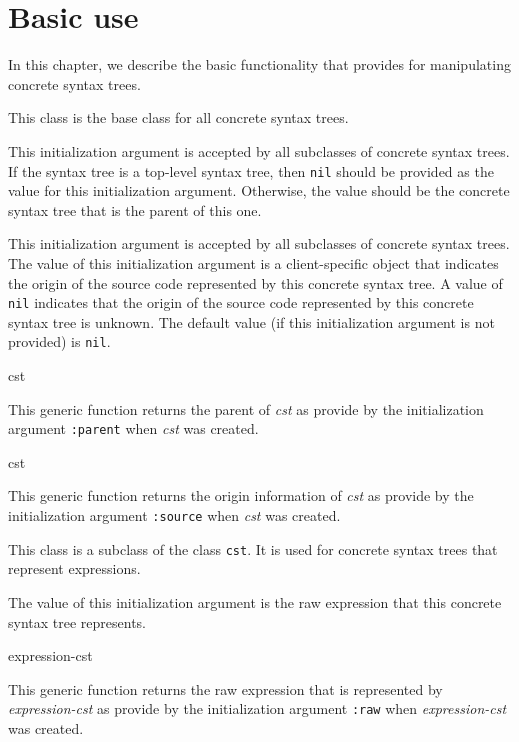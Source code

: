 \chapter{Basic use}

In this chapter, we describe the basic functionality that \sysname{}
provides for manipulating concrete syntax trees.


This class is the base class for all concrete syntax trees.


This initialization argument is accepted by all subclasses of concrete
syntax trees.  If the syntax tree is a top-level syntax tree, then
\texttt{nil} should be provided as the value for this initialization
argument.  Otherwise, the value should be the concrete syntax tree
that is the parent of this one.


This initialization argument is accepted by all subclasses of concrete
syntax trees.  The value of this initialization argument is a
client-specific object that indicates the origin of the source code
represented by this concrete syntax tree.  A value of \texttt{nil}
indicates that the origin of the source code represented by this concrete
syntax tree is unknown.  The default value (if this initialization
argument is not provided) is \texttt{nil}.

 {cst}

This generic function returns the parent of \textit{cst} as provide by
the initialization argument \texttt{:parent} when \textit{cst} was
created.

 {cst}

This generic function returns the origin information of \textit{cst}
as provide by the initialization argument \texttt{:source} when
\textit{cst} was created.


This class is a subclass of the class \texttt{cst}.  It is used for
concrete syntax trees that represent \commonlisp{} expressions.


The value of this initialization argument is the raw \commonlisp{}
expression that this concrete syntax tree represents.

 {expression-cst}

This generic function returns the raw \commonlisp{} expression that is
represented by \textit{expression-cst} as provide by the
initialization argument \texttt{:raw} when \textit{expression-cst} was
created.

